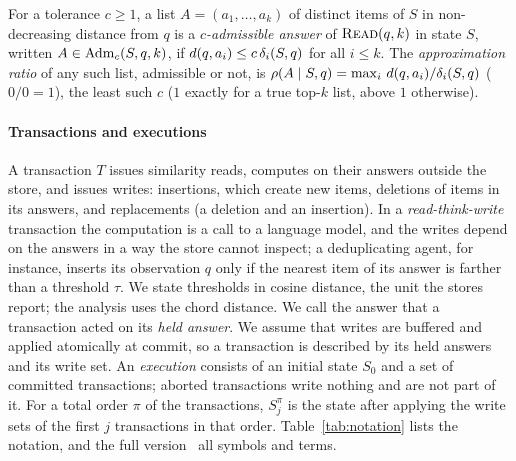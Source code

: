 \documentclass[sigconf, nonacm, review]{acmart}
\begin{document}
\begin{definition}
\label{def:adm}
For a tolerance $c\ge 1$, a list $A=(a_1,\dots,a_k)$ of distinct items
of $S$ in non-decreasing distance from $q$ is a \emph{$c$-admissible
answer} of $\textsc{Read}(q,k)$ in state $S$, written $A\in\mathrm{Adm}_c(S,q,k)$, if
$d(q,a_i)\le c\,\delta_i(S,q)$ for all $i\le k$. The
\emph{approximation ratio} of any such list, admissible or not, is
$\rho(A\mid S,q)=\max_{i}\,d(q,a_i)/\delta_i(S,q)$ ($0/0=1$),
the least such $c$ ($1$ exactly for a true top-$k$ list, above $1$ otherwise).
\end{definition}

\paragraph{Transactions and executions}
A transaction $T$ issues similarity reads, computes on their answers
outside the store, and issues writes: insertions, which create new
items, deletions of items in its answers, and replacements (a deletion
and an insertion). In a
\emph{read-think-write} transaction the computation is a call to a
language model, and the writes depend on the answers in a way the store
cannot inspect; a deduplicating agent, for instance, inserts its
observation $q$ only if the nearest item of its answer is farther than
a threshold $\tau$. We state thresholds in cosine distance, the unit the stores report;
the analysis uses the chord distance.
We call the answer that a transaction acted on its
\emph{held answer}. We assume that writes are buffered and applied
atomically at commit, so a transaction is described by its held answers
and its write set. An \emph{execution} consists of an initial state
$S_0$ and a set of committed transactions; aborted transactions write
nothing and are not part of it. For a total order $\pi$ of
the transactions, $S^\pi_j$ is the state after applying the write sets
of the first $j$ transactions in that order. Table~\ref{tab:notation}
lists the notation, and the full version~\cite[App.~H]{ariadnefull} all symbols and terms.
\end{document}
